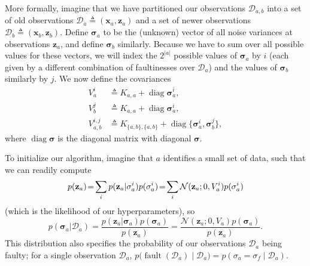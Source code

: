 \documentclass{article}
\newcommand{\deq}{\ensuremath{\triangleq}}
\newcommand{\given}{\ensuremath{\mid}}
\newcommand{\cm}[1]{\ensuremath{\mathcal{#1}}}
\newcommand{\bm}[1]{\ensuremath{\mathbf{#1}}}
\newcommand{\data}{\ensuremath{\cm{D}}}
\newcommand{\vect}[1]{\bm{#1}}
\newcommand{\vz}{\vect{z}}
\newcommand{\vx}{\vect{x}}
\newcommand{\vs}{\vect{\sigma}}
\newcommand{\fPr}{p}
\newcommand{\Prob}[2]{\fPr(#1 \given #2 )}
\newcommand{\ps}[2]{p(#1\vert#2)}
\newcommand{\N}[3]{\cm{N}( #1;#2,#3 )}
\newcommand{\defequal}{\triangleq}
\DeclareMathOperator{\fault}{fault}
\DeclareMathOperator{\diag}{diag}
\begin{document}
More formally, imagine that we have partitioned our observations
$\data_{a,b}$ into a set of old observations
$\data_a\deq(\vx_a,\vz_a)$ and a set of newer observations $\data_b
\deq (\vx_b,\vz_b)$. Define $\vs_{a}$ to be the (unknown) vector of
all noise variances at observations $\vz_{a}$, and define $\vs_{b}$
similarly. Because we have to sum over all possible values for these
vectors, we will index the $2^{\lvert a \rvert}$ possible values of
$\vs_{a}$ by $i$ (each given by a different combination of
faultinesses over $\data_a$) and the values of $\vs_{b}$ similarly by
$j$. We now define the covariances
\begin{align*}
 V_a^i & \defequal K_{a,a} + \diag \vs_{a}^i, \\
 V_b^j & \defequal K_{a,a} + \diag \vs_{a}^i, \\
 V_{a,b}^{i,j} & \defequal K_{\{a,b\},\{a,b\}} + \diag \{\vs_{a}^i,\vs_{b}^j\},
\end{align*}
where $\diag \vs$ is the diagonal matrix with diagonal $\vs$. 

To initialize our algorithm, imagine that $a$ identifies a small set
of data, such that we can readily compute
\begin{equation}
 \hspace{-0.0cm}p(\vz_a)\!=\!\sum_i  \ps{\vz_a}{\vs^i_a}\fPr(\vs^i_a)
\!=\! \sum_i \N{\vz_a}{0}{V_a^i}\fPr(\vs_a^i) \label{eq:likelihood_a}
\end{equation}
(which is the likelihood of our hyperparameters), so
\begin{equation*}
\ps{\vs_a}{\data_{a}} 
= \frac{\ps{\vz_a}{\vs_a}\fPr(\vs_a)}{p(\vz_a)} 
= \frac{\N{\vz_a}{0}{V_a} \fPr(\vs_a)}{p(\vz_a)}\label{eq:psa}.
\end{equation*}
This distribution also specifies the probability of our observations
$\data_a$ being faulty; for a single observation $\data_a$,
$
p\bigl(\fault(\data_a) \given \data_{a}\bigr) = \Prob{\sigma_a = \sigma_f}{\data_{a}}
$.
\end{document}

